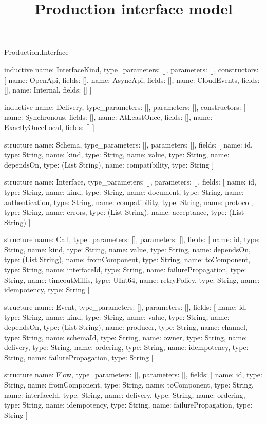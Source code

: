 \begin{lexlean}{Production.Interface}
\title{Production interface model}
\begin{semanticmodule}
inductive{
  name: InterfaceKind,
  type_parameters: [],
  parameters: [],
  constructors: [
    {name: OpenApi, fields: []},
    {name: AsyncApi, fields: []},
    {name: CloudEvents, fields: []},
    {name: Internal, fields: []}
  ]
}

inductive{
  name: Delivery,
  type_parameters: [],
  parameters: [],
  constructors: [
    {name: Synchronous, fields: []},
    {name: AtLeastOnce, fields: []},
    {name: ExactlyOnceLocal, fields: []}
  ]
}

structure{
  name: Schema,
  type_parameters: [],
  parameters: [],
  fields: [
    {name: id, type: String},
    {name: kind, type: String},
    {name: value, type: String},
    {name: dependsOn, type: (List String)},
    {name: compatibility, type: String}
  ]
}

structure{
  name: Interface,
  type_parameters: [],
  parameters: [],
  fields: [
    {name: id, type: String},
    {name: kind, type: String},
    {name: document, type: String},
    {name: authentication, type: String},
    {name: compatibility, type: String},
    {name: protocol, type: String},
    {name: errors, type: (List String)},
    {name: acceptance, type: (List String)}
  ]
}

structure{
  name: Call,
  type_parameters: [],
  parameters: [],
  fields: [
    {name: id, type: String},
    {name: kind, type: String},
    {name: value, type: String},
    {name: dependsOn, type: (List String)},
    {name: fromComponent, type: String},
    {name: toComponent, type: String},
    {name: interfaceId, type: String},
    {name: failurePropagation, type: String},
    {name: timeoutMillis, type: UInt64},
    {name: retryPolicy, type: String},
    {name: idempotency, type: String}
  ]
}

structure{
  name: Event,
  type_parameters: [],
  parameters: [],
  fields: [
    {name: id, type: String},
    {name: kind, type: String},
    {name: value, type: String},
    {name: dependsOn, type: (List String)},
    {name: producer, type: String},
    {name: channel, type: String},
    {name: schemaId, type: String},
    {name: owner, type: String},
    {name: delivery, type: String},
    {name: ordering, type: String},
    {name: idempotency, type: String},
    {name: failurePropagation, type: String}
  ]
}

structure{
  name: Flow,
  type_parameters: [],
  parameters: [],
  fields: [
    {name: id, type: String},
    {name: fromComponent, type: String},
    {name: toComponent, type: String},
    {name: interfaceId, type: String},
    {name: delivery, type: String},
    {name: ordering, type: String},
    {name: idempotency, type: String},
    {name: failurePropagation, type: String}
  ]
}
\end{semanticmodule}
\end{lexlean}
